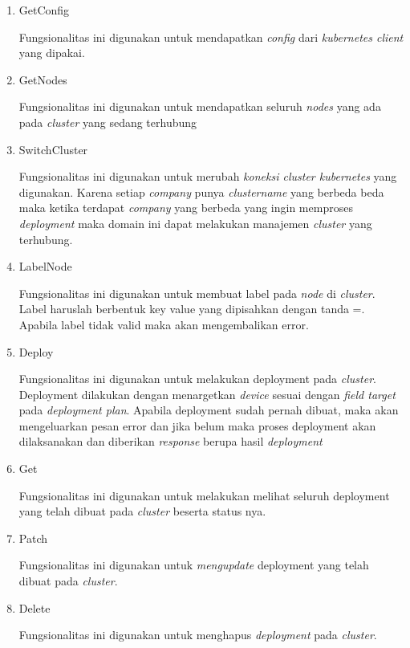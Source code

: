 \begin{enumerate}
  \item GetConfig

        Fungsionalitas ini digunakan untuk mendapatkan \textit{config} dari \textit{kubernetes client} yang dipakai.

  \item GetNodes

        Fungsionalitas ini digunakan untuk mendapatkan seluruh \textit{nodes} yang ada pada \textit{cluster} yang sedang terhubung

  \item SwitchCluster

        Fungsionalitas ini digunakan untuk merubah \textit{koneksi cluster kubernetes} yang digunakan. Karena setiap \textit{company} punya \textit{cluster\textunderscore name} yang berbeda beda maka ketika terdapat \textit{company} yang berbeda yang ingin memproses \textit{deployment} maka domain ini dapat melakukan manajemen \textit{cluster} yang terhubung.

  \item LabelNode

        Fungsionalitas ini digunakan untuk membuat label pada \textit{node} di \textit{cluster}. Label haruslah berbentuk key value yang dipisahkan dengan tanda =. Apabila label tidak valid maka akan mengembalikan error.

  \item Deploy

        Fungsionalitas ini digunakan untuk melakukan deployment pada \textit{cluster}. Deployment dilakukan dengan menargetkan \textit{device} sesuai dengan \textit{field target} pada \textit{deployment plan}. Apabila deployment sudah pernah dibuat, maka akan mengeluarkan pesan error dan jika belum maka proses deployment akan dilaksanakan dan diberikan \textit{response} berupa hasil \textit{deployment}

  \item Get

        Fungsionalitas ini digunakan untuk melakukan melihat seluruh deployment yang telah dibuat pada \textit{cluster} beserta status nya.



  \item Patch

        Fungsionalitas ini digunakan untuk \textit{mengupdate} deployment yang telah dibuat pada \textit{cluster}.

  \item Delete

        Fungsionalitas ini digunakan untuk menghapus \textit{deployment} pada \textit{cluster}.

\end{enumerate}